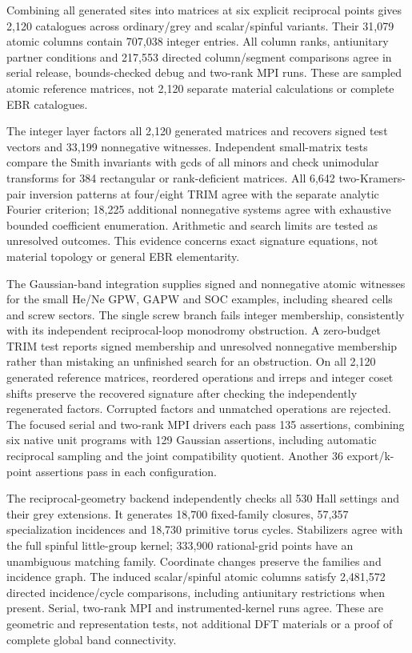 Combining all generated sites into matrices at six explicit reciprocal
points gives 2,120 catalogues across ordinary/grey and scalar/spinful
variants. Their 31,079 atomic columns contain 707,038 integer entries.
All column ranks, antiunitary partner conditions and 217,553 directed
column/segment comparisons agree in serial release, bounds-checked
debug and two-rank MPI runs. These are sampled atomic reference
matrices, not 2,120 separate material calculations or complete EBR
catalogues.

The integer layer factors all 2,120 generated matrices and recovers
signed test vectors and 33,199 nonnegative witnesses. Independent
small-matrix tests compare the Smith invariants with gcds of all
minors and check unimodular transforms for 384 rectangular or
rank-deficient matrices. All 6,642 two-Kramers-pair inversion patterns
at four/eight TRIM agree with the separate analytic Fourier criterion;
18,225 additional nonnegative systems agree with exhaustive bounded
coefficient enumeration. Arithmetic and search limits are tested as
unresolved outcomes. This evidence concerns exact signature equations,
not material topology or general EBR elementarity.

The Gaussian-band integration supplies signed and nonnegative
atomic witnesses for the small He/Ne GPW, GAPW and SOC examples,
including sheared cells and screw sectors. The single screw branch
fails integer membership, consistently with its independent
reciprocal-loop monodromy obstruction. A zero-budget TRIM test reports
signed membership and unresolved nonnegative membership rather than
mistaking an unfinished search for an obstruction. On all 2,120
generated reference matrices, reordered operations and irreps and
integer coset shifts preserve the recovered signature after checking
the independently regenerated factors. Corrupted factors and unmatched
operations are rejected. The focused serial and two-rank MPI drivers
each pass 135 assertions, combining six native unit programs with
129 Gaussian assertions, including automatic reciprocal sampling
and the joint compatibility quotient. Another 36 export/k-point
assertions pass in each configuration.

The reciprocal-geometry backend independently checks all 530 Hall
settings and their grey extensions. It generates 18,700 fixed-family
closures, 57,357 specialization incidences and 18,730 primitive torus
cycles. Stabilizers agree with the full spinful little-group kernel;
333,900 rational-grid points have an unambiguous matching family.
Coordinate changes preserve the families and incidence graph. The
induced scalar/spinful atomic columns satisfy 2,481,572 directed
incidence/cycle comparisons, including antiunitary restrictions when
present. Serial, two-rank MPI and instrumented-kernel runs agree.
These are geometric and representation tests, not additional DFT
materials or a proof of complete global band connectivity.

